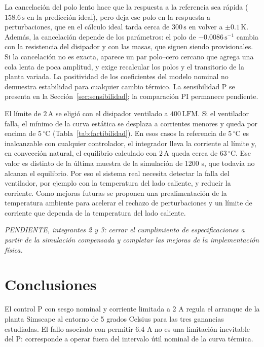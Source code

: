 \documentclass[journal,twocolumn]{IEEEtran}
\begin{document}
La cancelación del polo lento hace que la respuesta a la referencia sea rápida ($158.6\,\mathrm s$ en la predicción ideal), pero deja ese polo en la respuesta a perturbaciones, que en el cálculo ideal tarda cerca de $300\,\mathrm s$ en volver a $\pm0.1\,\mathrm K$. Además, la cancelación depende de los parámetros: el polo de $-0.0086\,\mathrm{s^{-1}}$ cambia con la resistencia del disipador y con las masas, que siguen siendo provisionales. Si la cancelación no es exacta, aparece un par polo--cero cercano que agrega una cola lenta de poca amplitud, y exige recalcular los polos y el transitorio de la planta variada. La positividad de los coeficientes del modelo nominal no demuestra estabilidad para cualquier cambio térmico. La sensibilidad P se presenta en la Sección~\ref{sec:sensibilidad}; la comparación PI permanece pendiente.

El límite de $2\,\mathrm A$ se eligió con el disipador ventilado a $400\,\mathrm{LFM}$. Si el ventilador falla, el mínimo de la curva estática se desplaza a corrientes menores y queda por encima de $5\,^\circ\mathrm C$ (Tabla~\ref{tab:factibilidad}). En esos casos la referencia de $5\,^\circ\mathrm C$ es inalcanzable con cualquier controlador, el integrador lleva la corriente al límite y, en convección natural, el equilibrio calculado con $2\,\mathrm A$ queda cerca de $63\,^\circ\mathrm C$. Ese valor es distinto de la última muestra de la simulación de 1200 s, que todavía no alcanza el equilibrio. Por eso el sistema real necesita detectar la falla del ventilador, por ejemplo con la temperatura del lado caliente, y reducir la corriente. Como mejoras futuras se proponen una prealimentación de la temperatura ambiente para acelerar el rechazo de perturbaciones y un límite de corriente que dependa de la temperatura del lado caliente.


\textit{PENDIENTE, integrantes 2 y 3: cerrar el cumplimiento de especificaciones a partir de la simulación compensada y completar las mejoras de la implementación física.}

\section{Conclusiones}
El control P con sesgo nominal y corriente limitada a 2 A regula el arranque de la planta Simscape al entorno de 5 grados Celsius para las tres ganancias estudiadas. El fallo asociado con permitir 6.4 A no es una limitación inevitable del P: corresponde a operar fuera del intervalo útil nominal de la curva térmica.
\end{document}

